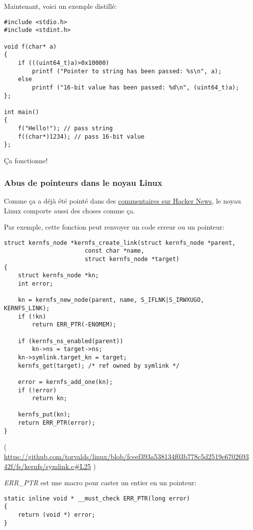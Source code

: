 Maintenant, voici un exemple distillé:

\begin{lstlisting}[style=customc]
#include <stdio.h>
#include <stdint.h>

void f(char* a)
{
	if (((uint64_t)a)>0x10000)
		printf ("Pointer to string has been passed: %s\n", a);
	else
		printf ("16-bit value has been passed: %d\n", (uint64_t)a);
};

int main()
{
	f("Hello!"); // pass string
	f((char*)1234); // pass 16-bit value
};
\end{lstlisting}

Ça fonctionne!

\subsubsection{Abus de pointeurs dans le noyau Linux}

Comme ça a déjà été pointé dans des \href{https://news.ycombinator.com/item?id=11823647}{commentaires sur Hacker News},
le noyau Linux comporte aussi des choses comme ça.

Par exemple, cette fonction peut renvoyer un code erreur ou un pointeur:

\begin{lstlisting}[style=customc]
struct kernfs_node *kernfs_create_link(struct kernfs_node *parent,
				       const char *name,
				       struct kernfs_node *target)
{
	struct kernfs_node *kn;
	int error;

	kn = kernfs_new_node(parent, name, S_IFLNK|S_IRWXUGO, KERNFS_LINK);
	if (!kn)
		return ERR_PTR(-ENOMEM);

	if (kernfs_ns_enabled(parent))
		kn->ns = target->ns;
	kn->symlink.target_kn = target;
	kernfs_get(target);	/* ref owned by symlink */

	error = kernfs_add_one(kn);
	if (!error)
		return kn;

	kernfs_put(kn);
	return ERR_PTR(error);
}
\end{lstlisting}

( \url{https://github.com/torvalds/linux/blob/fceef393a538134f03b778c5d2519e670269342f/fs/kernfs/symlink.c#L25} )

\emph{ERR\_PTR} est une macro pour caster un entier en un pointeur:

\begin{lstlisting}[style=customc]
static inline void * __must_check ERR_PTR(long error)
{
	return (void *) error;
}
\end{lstlisting}

